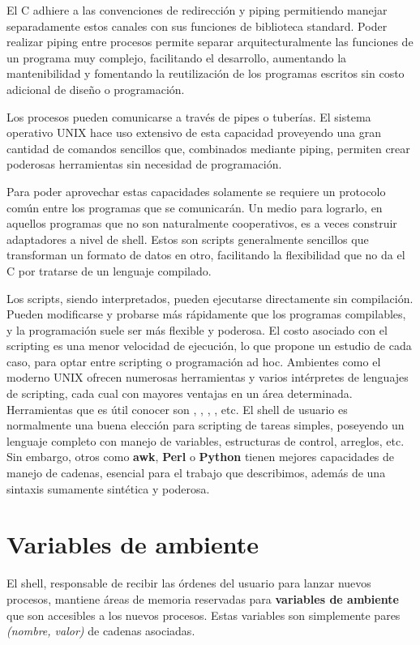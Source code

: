 El C adhiere a las convenciones de redirección y piping permitiendo manejar
separadamente estos canales con sus funciones de biblioteca standard. Poder
realizar piping entre procesos permite separar arquitecturalmente las funciones
de un programa muy complejo, facilitando el desarrollo, aumentando la
mantenibilidad y fomentando la reutilización de los programas escritos sin
costo adicional de diseño o programación.

 Los procesos pueden comunicarse a través de pipes o tuberías. El sistema
 operativo UNIX hace uso extensivo de esta capacidad proveyendo una gran
 cantidad de comandos sencillos que, combinados mediante piping, permiten crear
 poderosas herramientas sin necesidad de programación.

Para poder aprovechar estas capacidades solamente se requiere un protocolo
común entre los programas que se comunicarán. Un medio para lograrlo, en
aquellos programas que no son naturalmente cooperativos, es a veces construir
adaptadores a nivel de shell. Estos son scripts generalmente sencillos que
transforman un formato de datos en otro, facilitando la flexibilidad que no da
el C por tratarse de un lenguaje compilado.

Los scripts, siendo interpretados, pueden ejecutarse directamente sin
compilación. Pueden modificarse y probarse más rápidamente que los programas
compilables, y la programación suele ser más flexible y poderosa. El costo
asociado con el scripting es una menor velocidad de ejecución, lo que propone
un estudio de cada caso, para optar entre scripting o programación ad hoc.
Ambientes como el moderno UNIX ofrecen numerosas herramientas y varios
intérpretes de lenguajes de scripting, cada cual con mayores ventajas en un
área determinada. Herramientas que es útil conocer son , , , ,
etc. El shell de usuario es normalmente una buena elección para scripting de
tareas simples, poseyendo un lenguaje completo con manejo de variables,
estructuras de control, arreglos, etc. Sin embargo, otros como \textbf{awk}, \textbf{Perl} o
\textbf{Python} tienen mejores capacidades de manejo de cadenas, esencial para el
trabajo que describimos, además de una sintaxis sumamente sintética y poderosa.

\section{Variables de ambiente}
El shell, responsable de recibir las órdenes del usuario para lanzar nuevos
procesos, mantiene áreas de memoria reservadas para \textbf{variables de ambiente} que
son accesibles a los nuevos procesos. Estas variables son simplemente pares
\textit{(nombre, valor)} de cadenas asociadas. 


